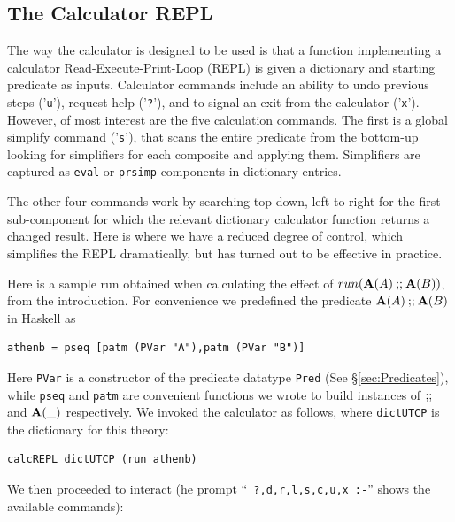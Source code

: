 \subsection{The Calculator REPL}

The way the calculator is designed to be used is
that a function implementing a calculator Read-Execute-Print-Loop (REPL)
is given a dictionary and starting predicate as inputs.
Calculator commands include an ability to undo previous steps ('\texttt{u}'),
request help ('\texttt{?}'),
and to signal an exit from the calculator ('\texttt{x}').
However,
of most interest are the five calculation commands.
The first is a global simplify command ('\texttt{s}'),
that scans the entire predicate from the bottom-up
looking for simplifiers for each composite and applying them.
Simplifiers are captured as \texttt{eval} or \texttt{prsimp} components
in dictionary entries.

The other four commands work by searching top-down, left-to-right for
the first sub-component for which the relevant dictionary calculator
function returns a changed result.
Here is where we have a reduced degree of control,
which simplifies the REPL dramatically,
but has turned out to be effective in practice.

Here is a sample run obtained when calculating the effect of
 $run(\mathbf{A}(A) \mathbin{\mathbf{;\!;}} \mathbf{A}(B))$, from the introduction.
For convenience we predefined the predicate $\mathbf{A}(A) \mathbin{\mathbf{;\!;}} \mathbf{A}(B)$ in Haskell as
\begin{verbatim}
athenb = pseq [patm (PVar "A"),patm (PVar "B")]
\end{verbatim}
Here \texttt{PVar} is a constructor of the predicate datatype \texttt{Pred}
(See \S\ref{sec:Predicates}),
while \texttt{pseq} and \texttt{patm} are convenient functions we wrote
to build instances
of $\mathbin{\mathbf{;\!;}}$ and $\mathbf{A}(\_)$ respectively.
We invoked the calculator as follows,
where \texttt{dictUTCP} is the dictionary for this theory:
\begin{verbatim}
calcREPL dictUTCP (run athenb)
\end{verbatim}
We then proceeded to interact
(he prompt  ``\texttt{ ?,d,r,l,s,c,u,x :-}''
shows the available commands):

